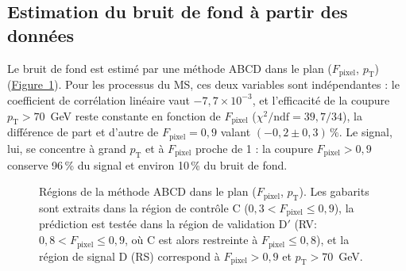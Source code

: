 \subsection{Estimation du bruit de fond à partir des données}

Le bruit de fond est estimé par une méthode ABCD dans le plan ($F_\mathrm{pixel}$, $p_\mathrm{T}$) (\hyperref[fig:resume:abcd]{Figure~\ref*{fig:resume:abcd}}). Pour les processus du MS, ces deux variables sont indépendantes : le coefficient de corrélation linéaire vaut $-7{,}7\times10^{-3}$, et l'efficacité de la coupure $p_\mathrm{T}>70$~GeV reste constante en fonction de $F_\mathrm{pixel}$ ($\chi^2/\mathrm{ndf}=39{,}7/34$), la différence de part et d'autre de $F_\mathrm{pixel}=0{,}9$ valant $(-0{,}2\pm0{,}3)\,\%$. Le signal, lui, se concentre à grand $p_\mathrm{T}$ et à $F_\mathrm{pixel}$ proche de 1 : la coupure $F_\mathrm{pixel}>0{,}9$ conserve 96\,\% du signal et environ 10\,\% du bruit de fond.

\begin{figure}[h!]
    \centering
    {\resumeTikzSafe
    }
    \caption{Régions de la méthode ABCD dans le plan ($F_\mathrm{pixel}$, $p_\mathrm{T}$). Les gabarits sont extraits dans la région de contrôle C ($0{,}3<F_\mathrm{pixel}\leq0{,}9$), la prédiction est testée dans la région de validation D$'$ (RV: $0{,}8<F_\mathrm{pixel}\leq0{,}9$, où C est alors restreinte à $F_\mathrm{pixel}\leq0{,}8$), et la région de signal D (RS) correspond à $F_\mathrm{pixel}>0{,}9$ et $p_\mathrm{T}>70$~GeV.}
    \label{fig:resume:abcd}
\end{figure}

